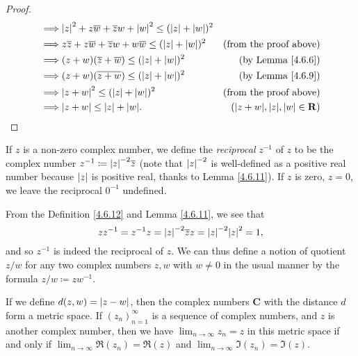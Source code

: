 \begin{proof}
\begin{align*}
        \implies & \abs*{z}^2 + z \overline{w} + \overline{z} w + \abs*{w}^2 \leq (\abs*{z} + \abs*{w})^2                                                                           \\
        \implies & z \overline{z} + z \overline{w} + \overline{z} w + w \overline{w} \leq (\abs*{z} + \abs*{w})^2               & \text{(from the proof above)}                     \\
        \implies & (z + w) (\overline{z} + \overline{w}) \leq (\abs*{z} + \abs*{w})^2                                           & \text{(by Lemma \ref{4.6.6})}                     \\
        \implies & (z + w) (\overline{z + w}) \leq (\abs*{z} + \abs*{w})^2                                                      & \text{(by Lemma \ref{4.6.9})}                     \\
        \implies & \abs*{z + w}^2 \leq (\abs*{z} + \abs*{w})^2                                                                  & \text{(from the proof above)}                     \\
        \implies & \abs*{z + w} \leq \abs*{z} + \abs*{w}.                                                                       & (\abs*{z + w}, \abs*{z}, \abs*{w} \in \mathbf{R})
    \end{align*}
\end{proof}

\begin{definition}\label{4.6.12}
    If \(z\) is a non-zero complex number, we define the \emph{reciprocal} \(z^{-1}\) of \(z\) to be the complex number \(z^{-1} \coloneqq \abs*{z}^{-2} \overline{z}\)
    (note that \(\abs*{z}^{-2}\) is well-defined as a positive real number because \(\abs*{z}\) is positive real, thanks to Lemma \ref{4.6.11}).
    If \(z\) is zero, \(z = 0\), we leave the reciprocal \(0^{-1}\) undefined.
\end{definition}

\begin{note}
    From the Definition \ref{4.6.12} and Lemma \ref{4.6.11}, we see that
    \[
        z z^{-1} = z^{-1} z = \abs*{z}^{-2} \overline{z} z = \abs*{z}^{-2} \abs*{z}^2 = 1,
    \]
    and so \(z^{-1}\) is indeed the reciprocal of \(z\).
    We can thus define a notion of quotient \(z / w\) for any two complex numbers \(z, w\) with \(w \neq 0\) in the usual manner by the formula \(z / w \coloneqq z w^{-1}\).
\end{note}

\begin{lemma}\label{4.6.13}
    If we define \(d(z, w) = \abs*{z - w}\), then the complex numbers \(\mathbf{C}\) with the distance \(d\) form a metric space.
    If \((z_n)_{n = 1}^\infty\) is a sequence of complex numbers, and \(z\) is another complex number, then we have \(\lim_{n \to \infty} z_n = z\) in this metric space if and only if \(\lim_{n \to \infty} \Re(z_n) = \Re(z)\) and \(\lim_{n \to \infty} \Im(z_n) = \Im(z)\).
\end{lemma}

